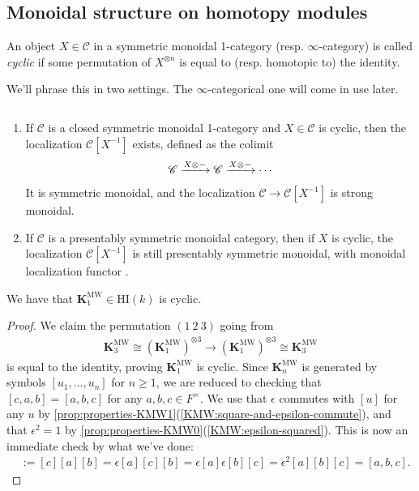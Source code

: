 \documentclass[11pt,openany]{book}
\providecommand{\HI}{\mathrm{HI}}
\providecommand{\KMW}{\mathbf{K}^\mathrm{MW}}
\begin{document}
\subsection{Monoidal structure on homotopy modules}



\begin{definition} An object $X\in \mathscr{C}$ in a symmetric monoidal 1-category (resp. $\infty$-category) is called \textit{cyclic} if some permutation of $X^{\otimes n}$ is equal to (resp. homotopic to) the identity.
\end{definition}

We'll phrase this in two settings. The $\infty$-categorical one will come in use later.

\begin{theorem}\label{thm:cyclic-objects-localization}  $\ $
\begin{enumerate}
    \item If $\mathscr{C}$ is a closed symmetric monoidal 1-category and $X \in \mathscr{C}$ is cyclic, then the localization $\mathscr{C}[X^{-1}]$ exists, defined as the colimit
    \begin{align*}
        \mathscr{C} \xrightarrow{X \otimes -} \mathscr{C} \xrightarrow{X \otimes-} \cdots 
    \end{align*}
    It is symmetric monoidal, and the localization $\mathscr{C} \to \mathscr{C}[X^{-1}]$ is strong monoidal.
    \item If $\mathscr{C}$ is a presentably symmetric monoidal category, then if $X$ is cyclic, the localization $\mathscr{C}[X^{-1}]$ is still presentably symmetric monoidal, with monoidal localization functor \cite[\S2]{Robalo}.
\end{enumerate}

\end{theorem}


\begin{proposition}\label{prop:KMW1-cyclic} 
We have that $\KMW_1 \in \HI(k)$ is cyclic.
\end{proposition}
\begin{proof} We claim the permutation $(1\ 2\ 3)$ going from
\begin{align*}
    \KMW_3 \cong (\KMW_1)^{\otimes3} \to (\KMW_1)^{\otimes 3} \cong \KMW_3
\end{align*}
is equal to the identity, proving $\KMW_1$ is cyclic. Since $\KMW_n$ is generated by symbols $[u_1, \ldots, u_n]$ for $n\ge 1$, we are reduced to checking that $[c,a,b] = [a,b,c]$ for any $a,b,c \in F^\times$. We use that $\epsilon$ commutes with $[u]$ for any $u$ by \autoref{prop:properties-KMW1}(\ref{KMW:square-and-epsilon-commute}), and that $\epsilon^2 = 1$ by \autoref{prop:properties-KMW0}(\ref{KMW:epsilon-squared}). This is now an immediate check by what we've done:
\begin{align*}
    [c,a,b] &:=[c][a][b] = \epsilon[a][c][b] = \epsilon[a]\epsilon[b][c] = \epsilon^2[a][b][c] = [a,b,c].
\end{align*}
\end{proof}
\end{document}
